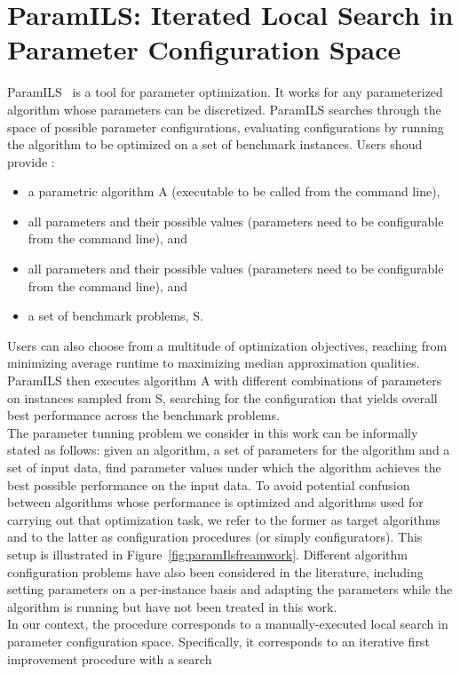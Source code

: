 \documentclass[a4paper,10pt]{article}
\begin{document}
\section{ParamILS: Iterated Local Search in Parameter Configuration Space}
ParamILS~\cite{hutter2009paramils} is a tool for parameter optimization. It works for any parameterized algorithm whose parameters can be discretized. ParamILS searches
through the space of possible parameter configurations, evaluating configurations by running the algorithm to be optimized on a set of benchmark instances.
Users shoud provide :
\begin{itemize}
\item a parametric algorithm A (executable to be called from the command line),
\item  all parameters and their possible values (parameters need to be configurable
from the command line), and
\item all parameters and their possible values (parameters need to be configurable
from the command line), and 
\item  a set of benchmark problems, S.
 \end{itemize}
Users can also choose from a multitude of optimization objectives, reaching from minimizing average runtime to maximizing median approximation qualities.
ParamILS then executes algorithm A with different combinations of parameters on instances sampled from S, searching for the configuration that yields
overall best performance across the benchmark problems.\\
The parameter tunning problem we consider in this work can be informally stated as follows: given an algorithm, a set of parameters for the algorithm and a set of input data, 
find parameter values under which the algorithm achieves the best possible performance on the input data.
To avoid potential confusion between algorithms whose performance is optimized and algorithms used for carrying out that optimization task,
we refer to the former as target algorithms and to the latter as configuration procedures (or simply configurators). This setup is illustrated in Figure~\ref{fig:paramIlsfreamwork}.
Different algorithm configuration problems have also been considered in the literature, including setting parameters on a per-instance basis and adapting the parameters while the algorithm
is running but have not been treated in this work.\\
In our context, the procedure corresponds to a manually-executed local search in parameter configuration space. Specifically, it corresponds to an iterative first improvement procedure with a search
\end{document}
